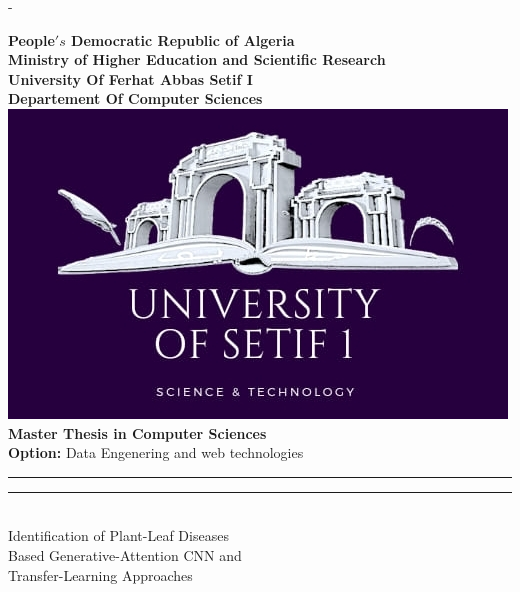 \begin{titlingpage}
\begin{SingleSpace}
\calccentering{\unitlength} 
\begin{adjustwidth*}{\unitlength}{-\unitlength}
\begin{center}
\Large \textbf{People$'s$ Democratic Republic of Algeria} \\
\vspace{2mm}
\Large \textbf{Ministry of Higher Education and Scientific Research} \\
\vspace{2mm}
\Large \textbf{University Of Ferhat Abbas Setif I} \\
\vspace{3mm}
{\Large \textbf{Departement Of Computer Sciences}  }\\[5mm]

\includegraphics[scale=0.5]{logos/ufas}\\
\vspace{5mm}
\Huge \textbf{Master Thesis in Computer Sciences}\\ [3mm]
\LARGE \textbf{Option:} Data Engenering and web technologies \\ [10mm]
\begin{minipage}{0.95\textwidth}
\begin{center}

\rule[0.5ex]{\linewidth}{2pt}\vspace*{-\baselineskip}\vspace*{3.2pt}
\rule[0.5ex]{\linewidth}{1pt}\\[\baselineskip] 
{\HUGE Identification of Plant-Leaf Diseases }\\ \vspace{4mm}
{\HUGE Based Generative-Attention CNN and } \\ \vspace{4mm}
{\HUGE Transfer-Learning Approaches }\\[4mm]


\end{center}
\end{minipage}
\end{center}
\end{adjustwidth*}
\end{SingleSpace}
\end{titlingpage}
